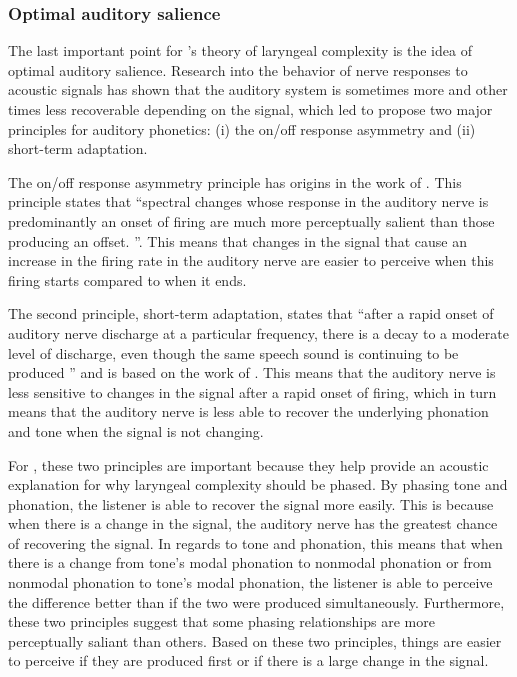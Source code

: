 \subsubsection{Optimal auditory salience}\label{sec:optimal_auditory_salience}

The last important point for \citeauthor{silvermanLaryngealComplexityOtomanguean1997}'s theory of laryngeal complexity is the idea of optimal auditory salience. Research into the behavior of nerve responses to acoustic signals has shown that the auditory system is sometimes more and other times less recoverable depending on the signal, which led \citet{bladonPhoneticsHearers1986} to propose two major principles for auditory phonetics: (i) the on/off response asymmetry and (ii) short-term adaptation.

The on/off response asymmetry principle has origins in the work of \citet{tylerPsychoacousticPhoneticTemporal1982}. This principle states that ``spectral changes whose response in the auditory nerve is predominantly an onset of firing are much more perceptually salient than those producing an offset. \citep[249]{silvermanLaryngealComplexityOtomanguean1997}''. This means that changes in the signal that cause an increase in the firing rate in the auditory nerve are easier to perceive when this firing starts compared to when it ends. 

The second principle, short-term adaptation, states that ``after a rapid onset of auditory nerve discharge at a particular frequency, there is a decay to a moderate level of discharge, even though the same speech sound is continuing to be produced \citep[250]{silvermanLaryngealComplexityOtomanguean1997}'' and is based on the work of \citet{delgutteCorrelatesPhoneticDistinctions1982}. This means that the auditory nerve is less sensitive to changes in the signal after a rapid onset of firing, which in turn means that the auditory nerve is less able to recover the underlying phonation and tone when the signal is not changing.

For \citeauthor{silvermanLaryngealComplexityOtomanguean1997}, these two principles are important because they help provide an acoustic explanation for why laryngeal complexity should be phased. By phasing tone and phonation, the listener is able to recover the signal more easily. This is because when there is a change in the signal, the auditory nerve has the greatest chance of recovering the signal. In regards to tone and phonation, this means that when there is a change from tone's modal phonation to nonmodal phonation or from nonmodal phonation to tone's modal phonation, the listener is able to perceive the difference better than if the two were produced simultaneously. Furthermore, these two principles suggest that some phasing relationships are more perceptually saliant than others. Based on these two principles, things are easier to perceive if they are produced first or if there is a large change in the signal. 

